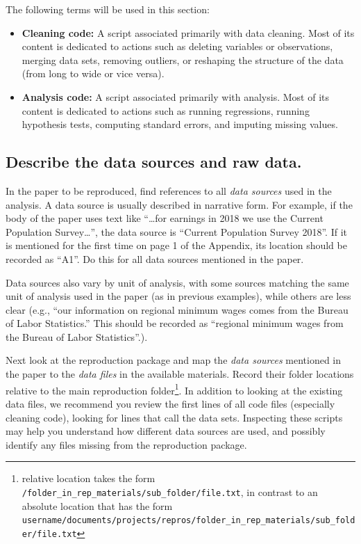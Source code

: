 \documentclass[]{book}
\begin{document}
The following terms will be used in this section:

\begin{itemize}
\item
  \textbf{Cleaning code:} A script associated primarily with data cleaning. Most of its content is dedicated to actions such as deleting variables or observations, merging data sets, removing outliers, or reshaping the structure of the data (from long to wide or vice versa).
\item
  \textbf{Analysis code:} A script associated primarily with analysis. Most of its content is dedicated to actions such as running regressions, running hypothesis tests, computing standard errors, and imputing missing values.
\end{itemize}

\hypertarget{describe-the-data-sources-and-raw-data.}{%
\subsection{Describe the data sources and raw data.}\label{describe-the-data-sources-and-raw-data.}}

In the paper to be reproduced, find references to all \emph{data sources} used in the analysis. A data source is usually described in narrative form. For example, if the body of the paper uses text like ``\ldots{}for earnings in 2018 we use the Current Population Survey\ldots{}'', the data source is ``Current Population Survey 2018''. If it is mentioned for the first time on page 1 of the Appendix, its location should be recorded as ``A1''. Do this for all data sources mentioned in the paper.

Data sources also vary by unit of analysis, with some sources matching the same unit of analysis used in the paper (as in previous examples), while others are less clear (e.g., ``our information on regional minimum wages comes from the Bureau of Labor Statistics.'' This should be recorded as ``regional minimum wages from the Bureau of Labor Statistics''.).

Next look at the reproduction package and map the \emph{data sources} mentioned in the paper to the \emph{data files} in the available materials. Record their folder locations relative to the main reproduction folder\footnote{relative location takes the form \texttt{/folder\_in\_rep\_materials/sub\_folder/file.txt}, in contrast to an absolute location that has the form \texttt{username/documents/projects/repros/folder\_in\_rep\_materials/sub\_folder/file.txt}}. In addition to looking at the existing data files, we recommend you review the first lines of all code files (especially cleaning code), looking for lines that call the data sets. Inspecting these scripts may help you understand how different data sources are used, and possibly identify any files missing from the reproduction package.
\end{document}
